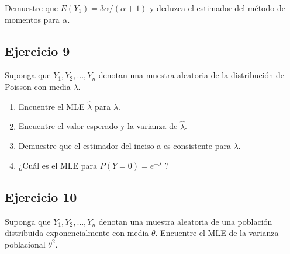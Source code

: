 \documentclass[
]{article}
\providecommand{\tightlist}{%
  \setlength{\itemsep}{0pt}\setlength{\parskip}{0pt}}
\begin{document}
Demuestre que \(E\left(Y_{1}\right)=3 \alpha /(\alpha+1)\) y deduzca el estimador del método de momentos para \(\alpha\).

\subsection{Ejercicio 9}\label{ejercicio-9-1}

Suponga que \(Y_{1}, Y_{2}, \ldots, Y_{n}\) denotan una muestra aleatoria de la distribución de Poisson con media \(\lambda\).

\begin{enumerate}
\def\labelenumi{\alph{enumi}.}
\tightlist
\item
  Encuentre el MLE \(\hat{\lambda}\) para \(\lambda\).
\item
  Encuentre el valor esperado y la varianza de \(\hat{\lambda}\).
\item
  Demuestre que el estimador del inciso a es consistente para \(\lambda\).
\item
  ¿Cuál es el MLE para \(P(Y=0)=e^{-\lambda}\) ?
\end{enumerate}

\subsection{Ejercicio 10}\label{ejercicio-10-1}

Suponga que \(Y_{1}, Y_{2}, \ldots, Y_{n}\) denotan una muestra aleatoria de una población distribuida exponencialmente con media \(\theta\). Encuentre el MLE de la varianza poblacional \(\theta^{2}\).
\end{document}
